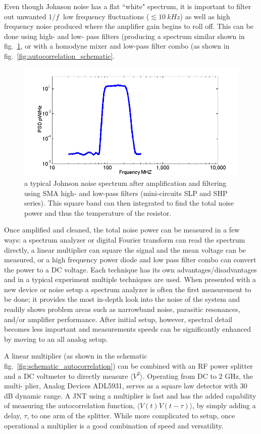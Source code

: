 Even though Johnson noise has a flat ``white" spectrum, it is important to filter out unwanted $1/f~$ low frequency fluctuations ($\lesssim 10~kHz$) as well as high frequency noise produced where the amplifier gain begins to roll off. 
This can be done using high- and low- pass filters (producing a spectrum similar shown in fig.~\ref{fig:Miteq_BP_spec}, or with a homodyne mixer and low-pass filter combo (as shown in fig.~\ref{fig:autocorrelation_schematic}. 
\begin{figure}
\includegraphics[width=\textwidth]{figures/Johnson_noise_thermometry/Miteq_BP_spec.png}
\caption{a typical Johnson noise spectrum after amplification and filtering using SMA high- and low-pass filters (mini-circuits SLP and SHP series). This square band can then integrated to find the total noise power and thus the temperature of the resistor.}
\label{fig:Miteq_BP_spec}
\end{figure}

Once amplified and cleaned, the total noise power can be measured in a few ways: a spectrum analyzer or digital Fourier transform can read the spectrum directly, a linear multiplier can square the signal and the mean voltage can be measured, or a high frequency power diode and low pass filter combo can convert the power to a DC voltage. Each technique has its own advantages/disadvantages and in a typical experiment multiple techniques are used. 
When presented with a new device or noise setup a spectrum analyzer is often the first measurement to be done; it provides the most in-depth look into the noise of the system and readily shows problem areas such as narrowband noise, parasitic resonances, and/or amplifier performance. After initial setup, however, spectral detail becomes less important and measurements speeds can be significantly enhanced by moving to an all analog setup. 

A linear multiplier (as shown in the schematic fig.~\ref{fig:schematic_autocorrelation}) can be combined with an RF power splitter and a DC voltmeter to directly measure $\langle V^2\rangle$. Operating from DC to 2 GHz, the multi-
plier, Analog Devices ADL5931, serves as a square law
detector with 30 dB dynamic range. A JNT using a multiplier is fast and has the added capability of measuring the autocorrelation function, $\langle V(t)V(t-\tau)\rangle$, by simply adding a delay, $\tau$, to one arm of the splitter. While more complicated to setup, once operational a multiplier is a good combination of speed and versatility.


